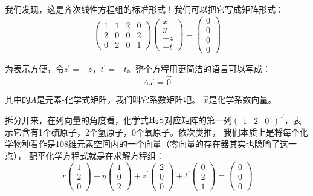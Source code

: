 \documentclass{ctexart}
\begin{document}
我们发现，这是齐次线性方程组的标准形式！我们可以把它写成矩阵形式：
\[
    \begin{pmatrix}
        1 & 1 & 2 & 0 \\
        2 & 0 & 0 & 2 \\
        0 & 2 & 0 & 1
    \end{pmatrix}
    \begin{pmatrix}
        x \\ y \\ -z \\ -t
    \end{pmatrix}
    =
    \begin{pmatrix}
        0 \\ 0 \\ 0 \\ 0
    \end{pmatrix}
\]

为表示方便，令\( z^\prime = -z \)，\( t^\prime = -t \)。整个方程用更简洁的语言可以写成：
\[
    A \vec{x} = \vec{0}
\]

其中的\(A\)是元素-化学式矩阵，我们叫它系数矩阵吧。 \(\vec{x}\)是化学系数向量。

拆分开来，在列向量的角度看，化学式\(\ce{H2S}\)对应矩阵的第一列\(
    \begin{pmatrix}1 & 2 & 0
\end{pmatrix}^{\mathrm{T}}\)，表示它含有1个硫原子，2个氢原子，0个氧原子。依次类推，
我们本质上是将每个化学物种看作是108维元素空间内的一个向量（零向量的存在器其实也隐喻了这一点），
配平化学方程式就是在求解方程组：
\[
    x
    \begin{pmatrix}1 \\ 2 \\ 0
    \end{pmatrix} + y
    \begin{pmatrix}1 \\ 0 \\ 2
    \end{pmatrix} + z^\prime
    \begin{pmatrix}2 \\ 0 \\ 0
    \end{pmatrix} + t^\prime
    \begin{pmatrix}0 \\ 2 \\ 1
    \end{pmatrix} =
    \begin{pmatrix}0 \\ 0 \\ 0
    \end{pmatrix}
\]
\end{document}
